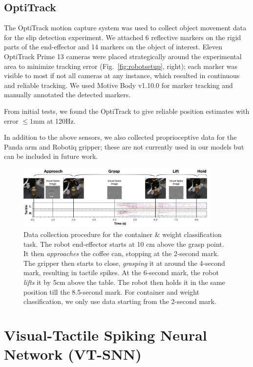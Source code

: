 \documentclass[fyp]{socreport}
\begin{document}
\section{OptiTrack}
The OptiTrack motion capture system was used to collect object movement data for
the slip detection experiment. We attached 6 reflective markers on the rigid
parts of the end-effector and 14 markers on the object of interest. Eleven
OptiTrack Prime 13 cameras were placed strategically around the experimental
area to minimize tracking error (Fig.~\ref{fig:robotsetup}, right); each marker
was visible to most if not all cameras at any instance, which resulted in
continuous and reliable tracking. We used Motive Body v1.10.0 for marker
tracking and manually annotated the detected markers.

From initial tests, we found the OptiTrack to give reliable position estimates
with error $\leq 1$mm at 120Hz.

In addition to the above sensors, we also collected proprioceptive data for the
Panda arm and Robotiq gripper; these are not currently used in our models but
can be included in future work.

\begin{figure}
\centering
\includegraphics[width=0.90\textwidth]{images/robotsetup/RobotMotion_Exp1.pdf}
\caption{Data collection procedure for the container \& weight classification
  task. The robot end-effector starts at 10 cm above the grasp point. It then
  \emph{approaches} the coffee can, stopping at the 2-second mark. The gripper
  then starts to close, \emph{grasping} it at around the 4-second mark,
  resulting in tactile spikes. At the 6-second mark, the robot \emph{lifts} it
  by 5cm above the table. The robot then holds it in the same position till the
  8.5-second mark. For container and weight classification, we only use data
  starting from the 2-second mark.\label{fig:robot_motion}}
\end{figure}

\chapter{Visual-Tactile Spiking Neural Network (VT-SNN)\label{cha:vtsnn}}
\end{document}
